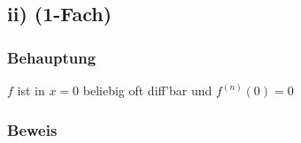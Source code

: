 \subsection*{ii) (1-Fach)}

\subsubsection*{Behauptung}

$f$ ist in $x = 0$ beliebig oft diff'bar und $f^{(n)}(0) = 0$

\subsubsection*{Beweis}






	
